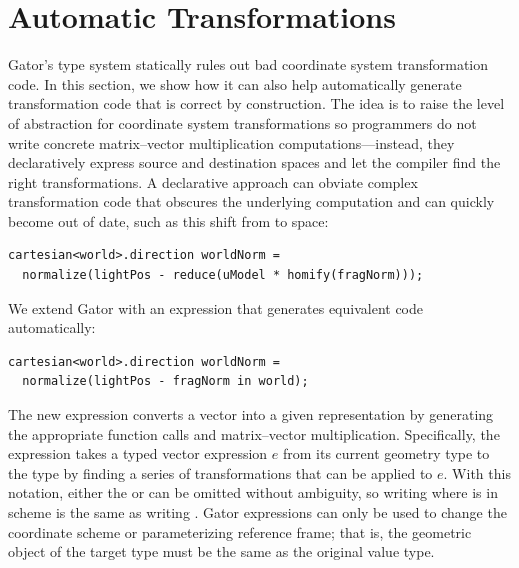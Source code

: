\section{Automatic Transformations}
\label{sec:in}

Gator's type system statically rules out bad coordinate system transformation code.
In this section, we show how it can also help automatically generate transformation code that is correct by construction.
The idea is to raise the level of abstraction for coordinate system transformations so programmers do not write concrete matrix--vector multiplication computations---instead, they declaratively express source and destination spaces and let the compiler find the right transformations.
A declarative approach can obviate complex transformation code that
obscures the underlying computation and can quickly become out of date, such as this shift from  to  space:
%
\begin{lstlisting}
cartesian<world>.direction worldNorm = 
  normalize(lightPos - reduce(uModel * homify(fragNorm)));
\end{lstlisting}
%
We extend Gator with an  expression that generates equivalent code automatically:
%
\begin{lstlisting}
cartesian<world>.direction worldNorm = 
  normalize(lightPos - fragNorm in world);
\end{lstlisting}
%
The new expression converts a vector into a given representation by generating the appropriate function calls and matrix--vector multiplication.
Specifically, the expression  takes a typed vector expression $e$ from its current geometry type  to the type  by finding a series of transformations that can be applied to $e$.
With this notation, either the  or  can be omitted without ambiguity, so writing  where  is in scheme  is the same as writing .
Gator  expressions can only be used to change the coordinate scheme or parameterizing reference frame; that is, the geometric object of the target type must be the same as the original value type.

